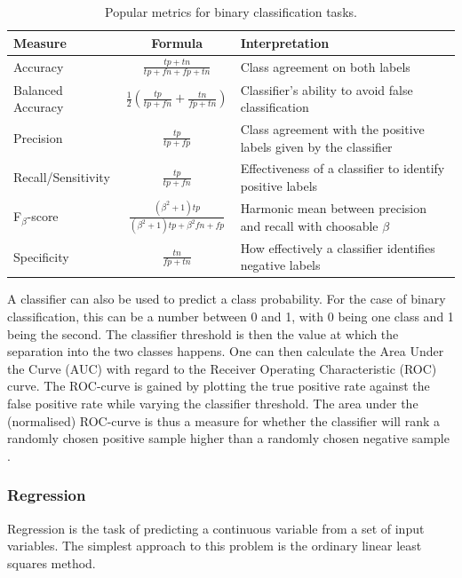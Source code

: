 \begin{table}
    \caption{Popular metrics for binary classification tasks.}
    \begin{center}
        \begin{tabularx}{\textwidth}{l c X}
            Measure & Formula & Interpretation \\
            \hline
            Accuracy & $\frac{tp+tn}{tp+fn+fp+tn}$ & Class agreement on both labels \\
            Balanced Accuracy & $\frac{1}{2}(\frac{tp}{tp+fn}+\frac{tn}{fp+tn})$ & Classifier’s ability to avoid false classification \\
            Precision & $\frac{tp}{tp+fp}$ & Class agreement with the positive labels given by the classifier \\
            Recall/Sensitivity & $\frac{tp}{tp+fn}$ & Effectiveness of a classifier to identify positive labels \\
            F$_{\beta}$-score & $\frac{(\beta^2+1)tp}{(\beta^2+1)tp+\beta^2fn+fp}$ & Harmonic mean between precision and recall with choosable $\beta$ \\
            Specificity & $\frac{tn}{fp+tn}$ & How effectively a classifier identifies negative labels \\
        \end{tabularx}
    \end{center}
    \label{tab:class_metrics}
\end{table}

A classifier can also be used to predict a class probability.
For the case of binary classification, this can be a number between 0 and 1,
with 0 being one class and 1 being the second.
The classifier threshold is then the value at which the separation into the two classes happens.
One can then calculate the Area Under the Curve (AUC) with regard to the Receiver Operating Characteristic (ROC) curve.
The ROC-curve is gained by plotting the true positive rate against the false positive rate while varying the classifier threshold.
The area under the (normalised) ROC-curve is thus a measure for whether the classifier will
rank a randomly chosen positive sample higher than a randomly chosen negative sample \cite{FAWCETT2006861}.

\subsubsection{Regression}
Regression is the task of predicting a continuous variable
from a set of input variables.
The simplest approach
to this problem is the ordinary linear least squares method.

